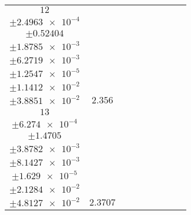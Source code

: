 \documentclass[8pt]{article}
\begin{document}
\begin{longtable}[l]{c c c c c c c c c}
$\num{12}$ & \begin{tabular}[c]{@{}c@{}}$\num{2.8388e-2}$ \\ $\pm\num{2.4963e-4}$\end{tabular} & \begin{tabular}[c]{@{}c@{}}$\num{-1.2234}$ \\ $\pm\num{0.52404}$\end{tabular} & \begin{tabular}[c]{@{}c@{}}$\num{-7.0287}$ \\ $\pm\num{1.8785e-3}$\end{tabular} & \begin{tabular}[c]{@{}c@{}}$\num{3.6198e+3}$ \\ $\pm\num{6.2719e-3}$\end{tabular} & \begin{tabular}[c]{@{}c@{}}$\num{7.2415}$ \\ $\pm\num{1.2547e-5}$\end{tabular} & \begin{tabular}[c]{@{}c@{}}$\num{1.1361}$ \\ $\pm\num{1.1412e-2}$\end{tabular} & \begin{tabular}[c]{@{}c@{}}$\num{4.2074}$ \\ $\pm\num{3.8851e-2}$\end{tabular} & $\num{2.356}$\\
$\num{13}$ & \begin{tabular}[c]{@{}c@{}}$\num{2.7945e-2}$ \\ $\pm\num{6.274e-4}$\end{tabular} & \begin{tabular}[c]{@{}c@{}}$\num{0.53606}$ \\ $\pm\num{1.4705}$\end{tabular} & \begin{tabular}[c]{@{}c@{}}$\num{-0.85622}$ \\ $\pm\num{3.8782e-3}$\end{tabular} & \begin{tabular}[c]{@{}c@{}}$\num{3.6259e+3}$ \\ $\pm\num{8.1427e-3}$\end{tabular} & \begin{tabular}[c]{@{}c@{}}$\num{7.2538}$ \\ $\pm\num{1.629e-5}$\end{tabular} & \begin{tabular}[c]{@{}c@{}}$\num{1.1601}$ \\ $\pm\num{2.1284e-2}$\end{tabular} & \begin{tabular}[c]{@{}c@{}}$\num{4.1166}$ \\ $\pm\num{4.8127e-2}$\end{tabular} & $\num{2.3707}$\\

\end{longtable}
\end{document}
